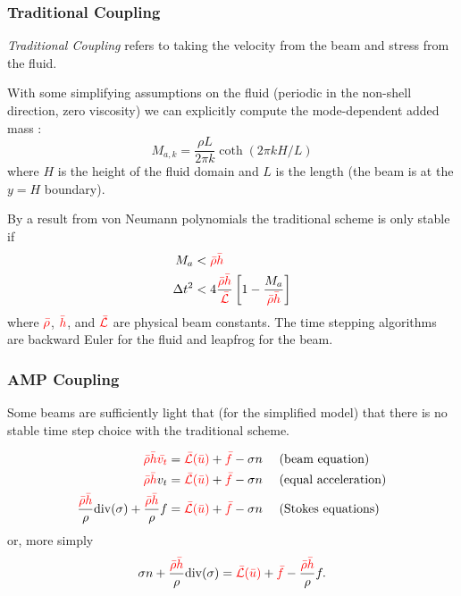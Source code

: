\documentclass[8pt]{beamer}
\newcommand{\leftd}[1]{{\color{red} \bar{#1}}}
\newcommand{\leftdd}[2]{{\color{red} \bar{#1}(\bar{#2})}}
\newcommand{\divergence}{\mathrm{div}}
\begin{document}
\begin{frame}
    \frametitle{Traditional Coupling}
    \emph{Traditional Coupling} refers to taking the velocity from the beam and
    stress from the fluid.

    With some simplifying assumptions on the fluid (periodic in the non-shell
    direction, zero viscosity) we can explicitly compute the mode-dependent
    added mass \cite{amp-incompressible, causin-gerbeau-nobile-2010}:
    \begin{equation}
        M_{a,k} = \dfrac{\rho L}{2 \pi k} \coth(2 \pi k H / L)
    \end{equation}
    where \(H\) is the height of the fluid domain and \(L\) is the length (the
    beam is at the \(y = H\) boundary).

    \pause
    By a result from von Neumann polynomials the traditional scheme is only
    stable if
    \begin{align}
        M_a &< \leftd{\rho} \leftd{h}                                         \\
        \Delta t^2 &< 4 \dfrac{\leftd{\rho} \leftd{h}}{\leftd{\mathcal{L}}}
        \left[1 - \dfrac{M_a}{\leftd{\rho} \leftd{h}}\right]
    \end{align}
    where \(\leftd{\rho}\), \(\leftd{h}\), and \(\leftd{\mathcal{L}}\) are
    physical beam constants. The time stepping algorithms are backward Euler for
    the fluid and leapfrog for the beam.
\end{frame}

\begin{frame}
    \frametitle{AMP Coupling}
    Some beams are sufficiently light that (for the simplified model) that there
    is no stable time step choice with the traditional scheme.

    \begin{align}
        \leftd{\rho} \leftd{h} \leftd{v_t}
        &= \leftdd{\mathcal{L}}{u} + \leftd{f} - \sigma n
        \quad \text{ (beam equation)}                                         \\
        \leftd{\rho} \leftd{h} v_t
        &= \leftdd{\mathcal{L}}{u} + \leftd{f} - \sigma n
        \quad \text{ (equal acceleration)}                                    \\
        \dfrac{\leftd{\rho} \leftd{h}}{\rho} \divergence(\sigma)
        + \dfrac{\leftd{\rho} \leftd{h}}{\rho} f
        &= \leftdd{\mathcal{L}}{u} + \leftd{f} - \sigma n
        \quad \text{ (Stokes equations)}
    \end{align}
    or, more simply
    \begin{equation}
        \sigma n + \dfrac{\leftd{\rho} \leftd{h}}{\rho} \divergence(\sigma)
        = \leftdd{\mathcal{L}}{u}
        + \leftd{f}
        - \dfrac{\leftd{\rho} \leftd{h}}{\rho} f.
    \end{equation}
\end{frame}
\end{document}
